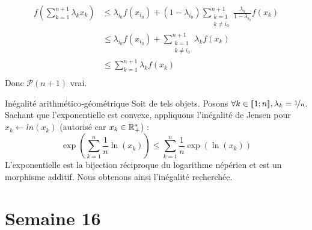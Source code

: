 \documentclass{article}
\renewenvironment{question_kholle}[2][ ]
{
	\subsection{\texorpdfstring{#2}{}}
	\notblank{#1}
	{
		\noindent #1
		\bigbreak
	}
	{}
	\begin{proof}
}
{
	\end{proof}
}
\begin{document}
\begin{question_kholle}
\begin{itemize}[label=*, leftmargin=0.5cm]
          \begin{equation*}
            \begin{aligned}
              f\left( \sum_{k=1}^{n+1} \lambda_k x_k \right)
               & \leqslant \lambda_{i_0} f(x_{i_0}) + \left( 1 - \lambda_{i_0} \right) \sum_{\begin{array}{c} k = 1 \\ k \neq i_0 \end{array}}^{n+1} \frac{\lambda_k}{1 - \lambda_{i_0}} f\left( x_k \right) \\
               & \leqslant \lambda_{i_0} f(x_{i_0}) + \sum_{\begin{array}{c} k = 1 \\ k \neq i_0 \end{array}}^{n+1} \lambda_k f\left( x_k \right)                                                            \\
               & \leqslant \sum_{k = 1}^{n+1} \lambda_k f\left( x_k \right)                                                                                                                                  \\
            \end{aligned}
          \end{equation*}
          Donc $\mathcal{P}(n+1)$ vrai.
  \end{itemize}
\end{question_kholle}

\begin{question_kholle}
  [Soit $n \in \N^*$. Soit $x \in \R_+^{*n}$.
    \begin{equation}
      \left( \prod_{k=1}^{n} x_k \right)^{\nicefrac{1}{n}}
      \leqslant \frac{1}{n} \sum_{k=1}^{n} x_k
    \end{equation}]
  {Inégalité arithmético-géométrique}
  Soit de tels objets. Posons $\forall k \in [\![1;n]\!], \lambda_k = \nicefrac{1}{n}$. \\
  Sachant que l'exponentielle est convexe, appliquons l'inégalité de Jensen pour $x_k \leftarrow ln(x_k)$ (autorisé car $x_k \in \mathbb R_+^*$) :
  \begin{equation*}
    \exp \left( \sum_{k=1}^{n} \frac{1}{n} \ln \left( x_k \right) \right)
    \leqslant \sum_{k=1}^{n} \frac{1}{n} \exp \left( \ln \left( x_k \right) \right)
  \end{equation*}
  L'exponentielle est la bijection réciproque du logarithme népérien et est un morphisme additif. Nous obtenons ainsi l'inégalité recherchée.
\end{question_kholle}
\pagebreak\section{Semaine 16}
\end{document}
